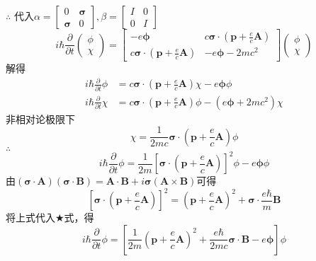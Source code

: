 \documentclass[12pt]{article}
\numberwithin{equation}{section}	 %
\begin{document}
\begin{spacing}{1.5}
\begin{equation}
\end{equation}
$\therefore$ 代入$\alpha=\begin{bmatrix} 0 & \bm\sigma \\ \bm\sigma & 0\end{bmatrix}, \beta=\begin{bmatrix} I & 0 \\ 0 & I \end{bmatrix}$
\begin{equation}
i\hbar\frac{\partial}{\partial t} \begin{pmatrix} \phi \\ \chi \end{pmatrix} = \begin{bmatrix}
-e\bm\phi & \displaystyle c\bm\sigma\cdot\left(\bm{p} +\frac{e}{c}\bm{A}\right) \\
\displaystyle c\bm\sigma\cdot\left(\bm{p} +\frac{e}{c}\bm{A}\right) & -e\bm\phi-2mc^{2}
\end{bmatrix} \begin{pmatrix} \phi \\ \chi \end{pmatrix} 
\end{equation}
解得
\begin{align*}
i\hbar\frac{\partial}{\partial t}\phi &= c\bm\sigma\cdot\left(\bm{p} +\frac{e}{c}\bm{A}\right)\chi - e\bm\phi\phi \\
i\hbar\frac{\partial}{\partial t}\chi &= c\bm\sigma\cdot\left(\bm{p} +\frac{e}{c}\bm{A}\right)\phi - \left(e\bm\phi + 2mc^{2}\right)\chi
\end{align*}
非相对论极限下
\begin{equation}
\chi = \frac{1}{2mc}\bm\sigma\cdot\left(\bm{p} +\frac{e}{c}\bm{A}\right)\phi
\end{equation}
$\therefore$
\begin{equation}
i\hbar\frac{\partial}{\partial t}\phi = \frac{1}{2m}\left[\bm\sigma\cdot\left(\bm{p} +\frac{e}{c}\bm{A}\right)\right]^{2}\phi - e\bm\phi\phi 
	\tag{$\bigstar$}
\end{equation}
由$(\bm\sigma\cdot\bm{A})(\bm\sigma\cdot\bm{B})=\bm{A}\cdot\bm{B}+i\bm\sigma(\bm{A}\times\bm{B})$可得
\begin{equation}
\left[\bm\sigma\cdot\left(\bm{p} +\frac{e}{c}\bm{A}\right)\right]^{2} = \left(\bm{p} +\frac{e}{c}\bm{A}\right)^{2} + \bm\sigma\cdot\frac{e\hbar}{m}\bm{B}
\end{equation}
将上式代入$\bigstar$式，得
\begin{equation}
i\hbar\frac{\partial}{\partial t}\phi = \left[\frac{1}{2m}\left(\bm{p} +\frac{e}{c}\bm{A}\right)^{2} + \frac{e\hbar}{2mc}\bm\sigma\cdot\bm{B} -e\bm\phi \right]\phi
\end{equation}


\end{spacing}
\end{document}
